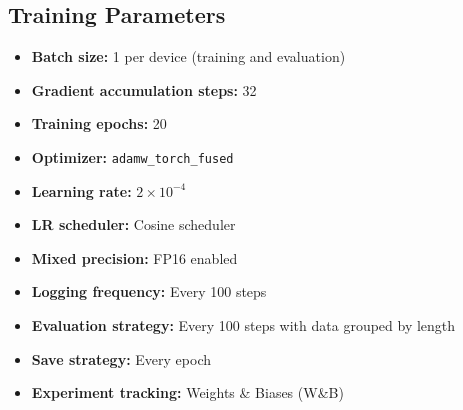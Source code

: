 \documentclass[10pt,twocolumn,letterpaper]{article}
\begin{document}
\subsection{Training Parameters}

\begin{itemize}
    \item \textbf{Batch size:} 1 per device (training and evaluation)
    \item \textbf{Gradient accumulation steps:} 32
    \item \textbf{Training epochs:} 20
    \item \textbf{Optimizer:} \texttt{adamw\_torch\_fused}
    \item \textbf{Learning rate:} $2 \times 10^{-4}$
    \item \textbf{LR scheduler:} Cosine scheduler
    \item \textbf{Mixed precision:} FP16 enabled
    \item \textbf{Logging frequency:} Every 100 steps
    \item \textbf{Evaluation strategy:} Every 100 steps with data grouped by length
    \item \textbf{Save strategy:} Every epoch
    \item \textbf{Experiment tracking:} Weights \& Biases (W\&B)
\end{itemize}
\end{document}
